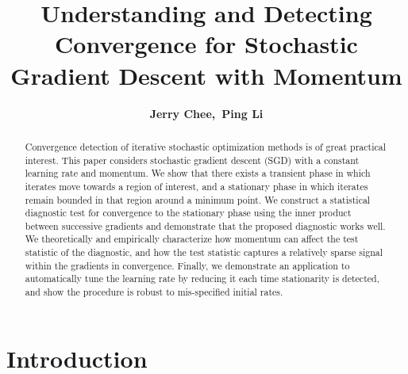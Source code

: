 \documentclass[conference]{IEEEtran}
\begin{document}
\title{Understanding and Detecting Convergence for Stochastic Gradient Descent with Momentum}

\author{\IEEEauthorblockN
{\bf Jerry Chee,\  Ping Li\vspace{0.08in}}
}



\maketitle

\begin{abstract}
 Convergence  detection of iterative stochastic optimization methods is of great practical interest.
This paper considers stochastic gradient descent (SGD) with a constant learning rate and momentum. We show that there exists a transient phase in which iterates move towards a region of interest, and a stationary phase in which iterates remain bounded in that region around a minimum point.
We construct a statistical diagnostic test for convergence to the stationary phase using the inner product between successive gradients and demonstrate that the proposed diagnostic works well. We theoretically and empirically characterize how momentum can affect the test statistic of the diagnostic, and how the test statistic captures a relatively sparse signal within the gradients in convergence.
Finally, we demonstrate an application to automatically tune the learning rate by reducing it each time stationarity is detected, and show the procedure is robust to mis-specified initial rates.


\end{abstract}




\section{Introduction}
\end{document}
